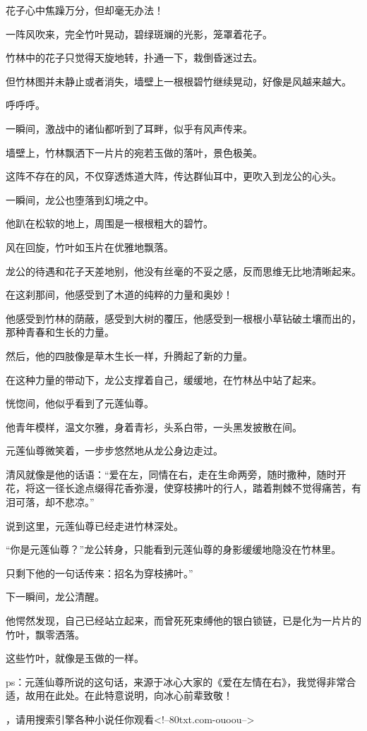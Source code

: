 \begin{this_body}
花子心中焦躁万分，但却毫无办法！

一阵风吹来，完全竹叶晃动，碧绿斑斓的光影，笼罩着花子。

竹林中的花子只觉得天旋地转，扑通一下，栽倒昏迷过去。

但竹林图并未静止或者消失，墙壁上一根根碧竹继续晃动，好像是风越来越大。

呼呼呼。

一瞬间，激战中的诸仙都听到了耳畔，似乎有风声传来。

墙壁上，竹林飘洒下一片片的宛若玉做的落叶，景色极美。

这阵不存在的风，不仅穿透炼道大阵，传达群仙耳中，更吹入到龙公的心头。

一瞬间，龙公也堕落到幻境之中。

他趴在松软的地上，周围是一根根粗大的碧竹。

风在回旋，竹叶如玉片在优雅地飘落。

龙公的待遇和花子天差地别，他没有丝毫的不妥之感，反而思维无比地清晰起来。

在这刹那间，他感受到了木道的纯粹的力量和奥妙！

他感受到竹林的荫蔽，感受到大树的覆压，他感受到一根根小草钻破土壤而出的，那种青春和生长的力量。

然后，他的四肢像是草木生长一样，升腾起了新的力量。

在这种力量的带动下，龙公支撑着自己，缓缓地，在竹林丛中站了起来。

恍惚间，他似乎看到了元莲仙尊。

他青年模样，温文尔雅，身着青衫，头系白带，一头黑发披散在间。

元莲仙尊微笑着，一步步悠然地从龙公身边走过。

清风就像是他的话语：“爱在左，同情在右，走在生命两旁，随时撒种，随时开花，将这一径长途点缀得花香弥漫，使穿枝拂叶的行人，踏着荆棘不觉得痛苦，有泪可落，却不悲凉。”

说到这里，元莲仙尊已经走进竹林深处。

“你是元莲仙尊？”龙公转身，只能看到元莲仙尊的身影缓缓地隐没在竹林里。

只剩下他的一句话传来：招名为穿枝拂叶。”

下一瞬间，龙公清醒。

他愕然发现，自己已经站立起来，而曾死死束缚他的银白锁链，已是化为一片片的竹叶，飘零洒落。

这些竹叶，就像是玉做的一样。

ps：元莲仙尊所说的这句话，来源于冰心大家的《爱在左情在右》，我觉得非常合适，故用在此处。在此特意说明，向冰心前辈致敬！

，请用搜索引擎各种小说任你观看<!--80txt.com-ouoou-->

\end{this_body}

